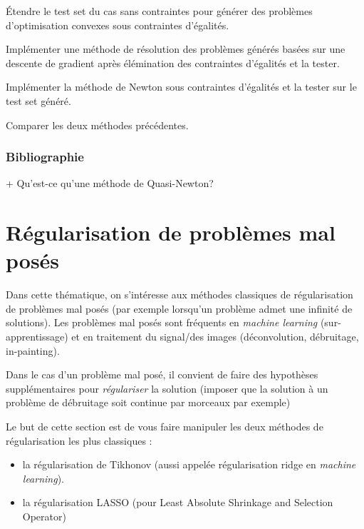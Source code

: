 \documentclass[11pt, a4paper]{article}
\begin{document}
\begin{question}
  Étendre le test set du cas sans contraintes pour générer des
  problèmes d'optimisation convexes sous contraintes d'égalités.
\end{question}

\begin{question}
  Implémenter une méthode de résolution des problèmes générés basées
  sur une descente de gradient après élémination des contraintes
  d'égalités et la tester.
\end{question}

\begin{question}
  Implémenter la méthode de Newton sous contraintes d'égalités et la
  tester sur le test set généré.
\end{question}

\begin{question}
  Comparer les deux méthodes précédentes.
\end{question}

\subsubsection{Bibliographie}

\begin{question}{+}
  Qu'est-ce qu'une méthode de Quasi-Newton?
\end{question}


\section{Régularisation de problèmes mal posés}

Dans cette thématique, on s'intéresse aux méthodes classiques de régularisation de problèmes mal posés (par exemple lorsqu'un problème admet une infinité de solutions). Les problèmes mal posés sont fréquents en \textit{machine learning} (sur-apprentissage) et en traitement du signal/des images (déconvolution, débruitage, in-painting).

Dans le cas d'un problème mal posé, il convient de faire des hypothèses supplémentaires pour \textit{régulariser} la solution (imposer que la solution à un problème de débruitage soit continue par morceaux par exemple)

Le but de cette section est de vous faire manipuler les deux méthodes de régularisation les plus classiques :
\begin{itemize}
\item la régularisation de Tikhonov (aussi appelée régularisation ridge en \textit{machine learning}).
\item la régularisation LASSO (pour Least Absolute Shrinkage and Selection Operator)
\end{itemize}
\end{document}
